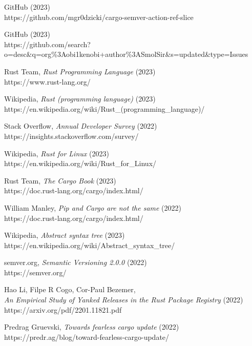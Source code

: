 \documentclass[licencjacka,en]{pracamgr}
\begin{document}
\begin{thebibliography}{99}
 GitHub (2023) \\
	https://github.com/mgr0dzicki/cargo-semver-action-ref-slice

 GitHub (2023) \\
	https://github.com/search?o=desc\&q=org\%3Aobi1kenobi+author\%3ASmolSir\&s=updated\&type=Issues

 Rust Team,
	\textit{Rust Programming Language} (2023) \\
	https://www.rust-lang.org/

 Wikipedia,
	\textit{Rust (programming language)} (2023) \\
	https://en.wikipedia.org/wiki/Rust\_(programming\_language)/

 Stack Overflow,
	\textit{Annual Developer Survey} (2022) \\
	https://insights.stackoverflow.com/survey/

 Wikipedia,
	\textit{Rust for Linux} (2023) \\
	https://en.wikipedia.org/wiki/Rust\_for\_Linux/

 Rust Team,
	\textit{The Cargo Book} (2023) \\
	https://doc.rust-lang.org/cargo/index.html/

 William Manley,
	\textit{Pip and Cargo are not the same} (2022) \\
	https://doc.rust-lang.org/cargo/index.html/

 Wikipedia,
	\textit{Abstract syntax tree} (2023) \\
	https://en.wikipedia.org/wiki/Abstract\_syntax\_tree/

 semver.org,
	\textit{Semantic Versioning 2.0.0} (2022) \\
	https://semver.org/

 Hao Li, Filpe R Cogo, Cor-Paul Bezemer, \\
    \textit{An Empirical Study of Yanked Releases in the Rust Package Registry}
    (2022) \\ https://arxiv.org/pdf/2201.11821.pdf

 Predrag Gruevski,
    \textit{Towards fearless cargo update} (2022) \\
    https://predr.ag/blog/toward-fearless-cargo-update/


\end{thebibliography}
\end{document}
